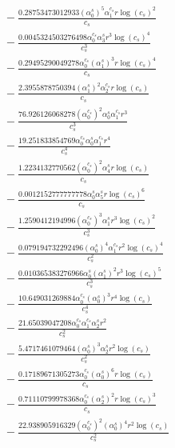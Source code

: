 \documentclass[10pt]{article}
\begin{document}
\begin{align*}
&{}  - \frac{0.28753473012933 \left(\alpha_{0}^s\right)^{5} \alpha_{1}^{c_s} r \log{\left(c_{s} \right)}^{2}}{c_{s}} \\
&{}  - \frac{0.0045324503276498 \alpha_{0}^{c_s} \alpha_{3}^s r^{3} \log{\left(c_{s} \right)}^{4}}{c_{s}^{3}} \\
&{}  - \frac{0.29495290049278 \alpha_{0}^{c_s} \left(\alpha_{1}^s\right)^{3} r \log{\left(c_{s} \right)}^{4}}{c_{s}} \\
&{}  - \frac{2.3955878750394 \left(\alpha_{1}^s\right)^{2} \alpha_{2}^{c_s} r \log{\left(c_{s} \right)}}{c_{s}} \\
&{}  - \frac{76.926126068278 \left(\alpha_{0}^{c_s}\right)^{2} \alpha_{0}^s \alpha_{1}^{c_s} r^{3}}{c_{s}^{3}} \\
&{}  - \frac{19.251833854769 \alpha_{0}^{c_s} \alpha_{0}^s \alpha_{1}^{c_s} r^{4}}{c_{s}^{4}} \\
&{}  - \frac{1.2234132770562 \left(\alpha_{0}^{c_s}\right)^{2} \alpha_{4}^s r \log{\left(c_{s} \right)}}{c_{s}} \\
&{}  - \frac{0.0012152777777778 \alpha_{0}^s \alpha_{5}^s r \log{\left(c_{s} \right)}^{6}}{c_{s}} \\
&{}  - \frac{1.2590412194996 \left(\alpha_{0}^{c_s}\right)^{3} \alpha_{1}^s r^{3} \log{\left(c_{s} \right)}^{2}}{c_{s}^{3}} \\
&{}  - \frac{0.079194732292496 \left(\alpha_{0}^s\right)^{4} \alpha_{1}^{c_s} r^{2} \log{\left(c_{s} \right)}^{4}}{c_{s}^{2}} \\
&{}  - \frac{0.010365383276966 \alpha_{0}^s \left(\alpha_{1}^s\right)^{2} r^{3} \log{\left(c_{s} \right)}^{5}}{c_{s}^{3}} \\
&{}  - \frac{10.649031269884 \alpha_{0}^{c_s} \left(\alpha_{0}^s\right)^{3} r^{4} \log{\left(c_{s} \right)}}{c_{s}^{4}} \\
&{}  - \frac{21.65039047208 \alpha_{0}^{c_s} \alpha_{1}^{c_s} \alpha_{2}^s r^{2}}{c_{s}^{2}} \\
&{}  - \frac{5.4717461079464 \left(\alpha_{0}^s\right)^{3} \alpha_{2}^s r^{2} \log{\left(c_{s} \right)}}{c_{s}^{2}} \\
&{}  - \frac{0.17189671305273 \alpha_{0}^{c_s} \left(\alpha_{0}^s\right)^{6} r \log{\left(c_{s} \right)}}{c_{s}} \\
&{}  - \frac{0.71110799978368 \alpha_{0}^{c_s} \left(\alpha_{2}^s\right)^{2} r \log{\left(c_{s} \right)}^{3}}{c_{s}} \\
&{}  - \frac{22.938905916329 \left(\alpha_{0}^{c_s}\right)^{2} \left(\alpha_{0}^s\right)^{4} r^{2} \log{\left(c_{s} \right)}}{c_{s}^{2}} \\

\end{align*}
\end{document}
